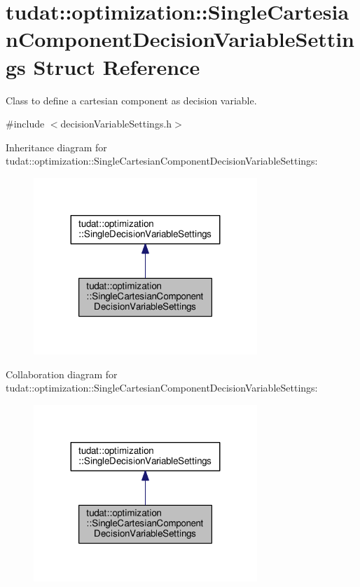 \hypertarget{structtudat_1_1optimization_1_1SingleCartesianComponentDecisionVariableSettings}{}\section{tudat\+:\+:optimization\+:\+:Single\+Cartesian\+Component\+Decision\+Variable\+Settings Struct Reference}
\label{structtudat_1_1optimization_1_1SingleCartesianComponentDecisionVariableSettings}


Class to define a cartesian component as decision variable.  




{\ttfamily \#include $<$decision\+Variable\+Settings.\+h$>$}



Inheritance diagram for tudat\+:\+:optimization\+:\+:Single\+Cartesian\+Component\+Decision\+Variable\+Settings\+:
\nopagebreak
\begin{figure}[H]
\begin{center}
\leavevmode
\includegraphics[width=239pt]{structtudat_1_1optimization_1_1SingleCartesianComponentDecisionVariableSettings__inherit__graph}
\end{center}
\end{figure}


Collaboration diagram for tudat\+:\+:optimization\+:\+:Single\+Cartesian\+Component\+Decision\+Variable\+Settings\+:
\nopagebreak
\begin{figure}[H]
\begin{center}
\leavevmode
\includegraphics[width=239pt]{structtudat_1_1optimization_1_1SingleCartesianComponentDecisionVariableSettings__coll__graph}
\end{center}
\end{figure}
